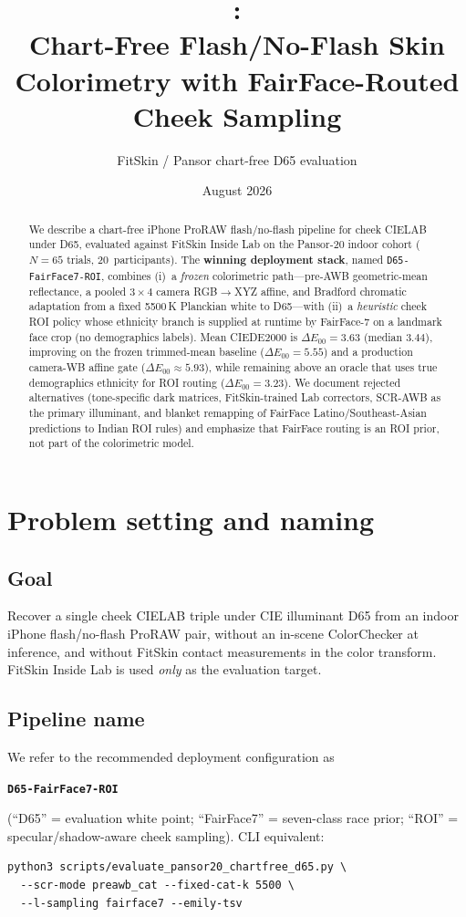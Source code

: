\documentclass[11pt]{article}
\title{\pipename{}:\\
  Chart-Free Flash/No-Flash Skin Colorimetry with FairFace-Routed Cheek Sampling}
\author{%
  FitSkin / Pansor chart-free D65 evaluation
}
\date{August 2026}
\newcommand{\deee}{\ensuremath{\Delta E_{00}}}
\newcommand{\pipename}{\texttt{D65-FairFace7-ROI}}
\begin{document}
\maketitle

\begin{abstract}
We describe a chart-free iPhone ProRAW flash/no-flash pipeline for cheek CIELAB under D65, evaluated against FitSkin Inside Lab on the Pansor-20 indoor cohort ($N=65$ trials, 20~participants).
The \textbf{winning deployment stack}, named \pipename{}, combines (i)~a \emph{frozen} colorimetric path---pre-AWB geometric-mean reflectance, a pooled $3{\times}4$ camera RGB$\to$XYZ affine, and Bradford chromatic adaptation from a fixed 5500\,K Planckian white to D65---with (ii)~a \emph{heuristic} cheek ROI policy whose ethnicity branch is supplied at runtime by FairFace-7 on a landmark face crop (no demographics labels).
Mean CIEDE2000 is $\deee=\num{3.63}$ (median $\num{3.44}$), improving on the frozen trimmed-mean baseline ($\deee=\num{5.55}$) and a production camera-WB affine gate ($\deee\approx\num{5.93}$), while remaining above an oracle that uses true demographics ethnicity for ROI routing ($\deee=\num{3.23}$).
We document rejected alternatives (tone-specific dark matrices, FitSkin-trained Lab correctors, SCR-AWB as the primary illuminant, and blanket remapping of FairFace Latino/Southeast-Asian predictions to Indian ROI rules) and emphasize that FairFace routing is an ROI prior, not part of the colorimetric model.
\end{abstract}

\tableofcontents
\newpage

\section{Problem setting and naming}

\subsection{Goal}
Recover a single cheek CIELAB triple under CIE illuminant D65 from an indoor iPhone flash/no-flash ProRAW pair, without an in-scene ColorChecker at inference, and without FitSkin contact measurements in the color transform.
FitSkin Inside Lab is used \emph{only} as the evaluation target.

\subsection{Pipeline name}
We refer to the recommended deployment configuration as
\begin{center}
  \textbf{\pipename{}}
\end{center}
(``D65'' = evaluation white point; ``FairFace7'' = seven-class race prior; ``ROI'' = specular/shadow-aware cheek sampling).
CLI equivalent:
\begin{verbatim}
python3 scripts/evaluate_pansor20_chartfree_d65.py \
  --scr-mode preawb_cat --fixed-cat-k 5500 \
  --l-sampling fairface7 --emily-tsv
\end{verbatim}
\end{document}
